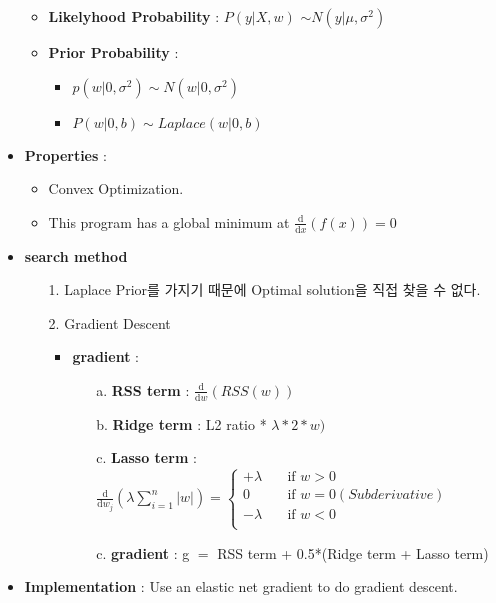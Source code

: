 \documentclass{article}
\begin{document}
\begin{itemize}
\begin{itemize}
             \item \textbf{Likelyhood Probability} : $P(y|X,w)$ $\sim N(y|\mu, {\sigma}^{2})$
             \item \textbf{Prior Probability} : 
                \begin{itemize}
                    \item $p(w|0,\sigma^2) \sim N(w|0,\sigma^2)$
                    \item $P(w|0,b) \sim Laplace(w|0, b)$
                \end{itemize}
         \end{itemize}
    \item \textbf{Properties} : 
    \begin{itemize}
        \item Convex Optimization.
        \item This program has a global minimum at $\frac{\mathrm d}{\mathrm d x} \left( f(x) \right)=0$
    \end{itemize}
    \item \textbf{search method}
    \begin{itemize}
        \item[1.] Laplace Prior를 가지기 때문에 Optimal solution을 직접 찾을 수 없다.
        \item[2.] Gradient Descent
        \begin{itemize}
            \item \textbf{gradient} : 
                \begin{itemize}
                    \item[a.] \textbf{RSS term} : $\frac{\mathrm d}{\mathrm d w} \left( RSS(w) \right)$
                    \item[b.] \textbf{Ridge term} : L2 ratio * $\lambda*2*w)$
                    \item[c.] \textbf{Lasso term} : $ \frac{\mathrm d}{\mathrm d w_j} \left(\lambda\sum_{i=1}^{n}{|w|} \right) = 
                                                        \begin{cases}
                                                            +\lambda       & \quad \text{if } w > 0\\
                                                             0             &\quad \text{if } w = 0 (Sub derivative)\\
                                                            -\lambda       &\quad \text{if } w < 0 \\
                                                        \end{cases}
                                                        $
                    \item[c.] \textbf{gradient} : g $=$ RSS term + 0.5*(Ridge term + Lasso term)
                \end{itemize}
        \end{itemize}
    \end{itemize}
    
    \item \textbf{Implementation} : Use an elastic net gradient to do gradient descent.
\end{itemize}
\end{document}
